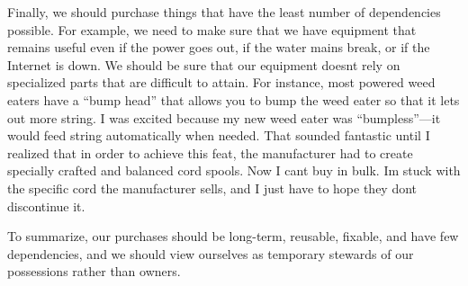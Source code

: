 \begin{infonote}
Finally, we should purchase things that have the least number of
dependencies possible.
For example, we need
to make sure that we have equipment that remains useful even if the
power goes out, if the water mains break, or if the Internet is down.
We should be sure that our equipment doesn{\textquotesingle}t rely on
specialized parts that are difficult to attain. For instance, most
powered weed eaters have a “bump head” that allows you to bump the weed
eater so that it lets out more string. I was excited because my new
weed eater was “bumpless”—it would feed string automatically when
needed. That sounded fantastic until I realized that in order to
achieve this feat, the manufacturer had to create specially crafted and
balanced cord spools. Now I can{\textquotesingle}t buy in bulk.
I{\textquotesingle}m stuck with the specific cord the manufacturer
sells, and I just have to hope they don{\textquotesingle}t discontinue
it.

To summarize, our purchases should be long-term, reusable, fixable, and
have few dependencies, and we should view ourselves as temporary
stewards of our possessions rather than owners.
\end{infonote}
